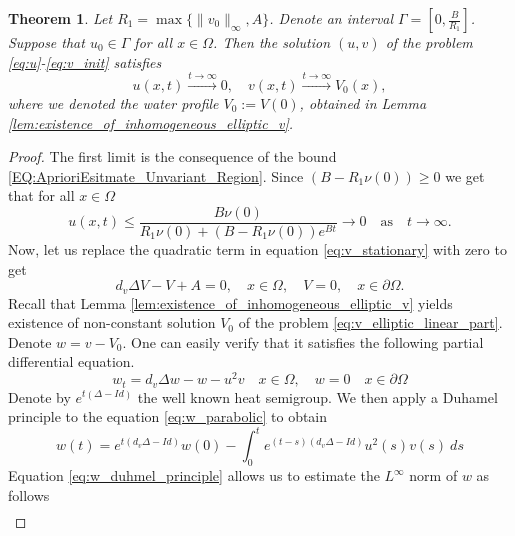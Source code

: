 \documentclass[12pt, a4paper]{article}
\theoremstyle{break}
\newtheorem{thm}{Theorem}[section]
\theoremstyle{break}
\theoremstyle{break}
\theoremstyle{break}
\theoremstyle{break}
\theoremstyle{break}
\theoremstyle{break}
\begin{document}
\begin{thm}
    Let $R_1 = \max\{\|v_0\|_\infty, A\}$. Denote an interval $\Gamma  = \left[0, \frac{B}{R_1}\right]$. Suppose that $u_0 \in \Gamma$ for all $x \in \Omega$. Then the solution $(u, v)$ of the problem \eqref{eq:u}-\eqref{eq:v_init} satisfies
    \begin{equation}
        u(x,t) \xrightarrow{t \rightarrow \infty} 0, \quad v(x,t) \xrightarrow{t \rightarrow \infty} V_0(x),
    \end{equation}
    where we denoted the water profile $V_0 := V(0)$, obtained in Lemma \ref{lem:existence_of_inhomogeneous_elliptic_v}.
\end{thm}
\begin{proof}
    The first limit is the consequence of the bound \eqref{EQ:AprioriEsitmate_Unvariant_Region}. Since $(B - R_1\nu(0)) \geq 0$ we get that for all $x \in \Omega$
    \begin{equation*}
        u(x,t) \leq \frac{B\nu(0)}{R_1 \nu(0) + 
        (B - R_1 \nu(0)) e^{B t}} \rightarrow 0 \quad \text{as} \quad t \rightarrow \infty.
    \end{equation*}
    Now, let us replace the quadratic term in equation \eqref{eq:v_stationary} with zero to get
    \begin{equation}
        \label{eq:v_elliptic_linear_part}
        d_v \Delta V - V + A = 0, \quad x \in \Omega, \quad V = 0, \quad x \in \partial \Omega.
    \end{equation}
    Recall that Lemma \ref{lem:existence_of_inhomogeneous_elliptic_v} yields existence of non-constant solution $V_0$ of the problem \eqref{eq:v_elliptic_linear_part}. Denote $w = v - V_0$. One can easily verify that it satisfies the following partial differential equation.
    \begin{equation}
        \label{eq:w_parabolic}
        w_t = d_v\Delta w - w - u^2v \quad x \in \Omega, \quad w = 0 \quad x \in \partial\Omega
    \end{equation}
    Denote by $e^{t(\Delta - Id)}$ the well known heat semigroup. We then apply a Duhamel principle to the equation \eqref{eq:w_parabolic} to obtain
    \begin{equation}
        \label{eq:w_duhmel_principle}
        w(t) = e^{t(d_v\Delta - Id)} w(0) - \int_0^t e^{(t-s)(d_v\Delta - Id)} u^2(s) v(s)\:ds
    \end{equation}
    Equation \eqref{eq:w_duhmel_principle} allows us to estimate the $L^\infty$ norm of $w$ as follows
    \begin{align}

\end{align}
\end{proof}
\end{document}
